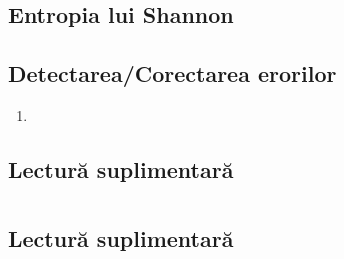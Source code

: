 \documentclass[a4paper,10pt]{article}
\begin{document}
\subsection{Entropia lui Shannon}

\subsection{Detectarea/Corectarea erorilor}
\begin{enumerate}
    \item 
\end{enumerate}

\subsection{Lectură suplimentară}


\section{}
\subsection{}

\subsection{}

\subsection{}

\subsection{Lectură suplimentară}


\section{}
\subsection{}

\subsection{}

\subsection{}
\end{document}
